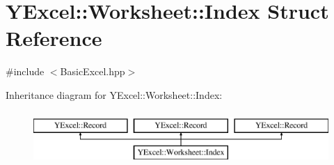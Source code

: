 \hypertarget{struct_y_excel_1_1_worksheet_1_1_index}{}\section{Y\+Excel\+:\+:Worksheet\+:\+:Index Struct Reference}
\label{struct_y_excel_1_1_worksheet_1_1_index}


{\ttfamily \#include $<$Basic\+Excel.\+hpp$>$}

Inheritance diagram for Y\+Excel\+:\+:Worksheet\+:\+:Index\+:\begin{figure}[H]
\begin{center}
\leavevmode
\includegraphics[height=2.000000cm]{struct_y_excel_1_1_worksheet_1_1_index}
\end{center}
\end{figure}
